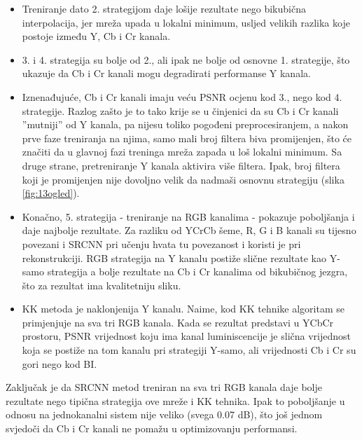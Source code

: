 \documentclass[12pt]{report}
\numberwithin{equation}{section}
\begin{document}
  \begin{itemize}
  
   \item Treniranje dato 2. strategijom daje lošije rezultate nego bikubična interpolacija, jer mreža upada u lokalni minimum, usljed velikih razlika koje postoje između Y, Cb i Cr kanala. 
   \item 3. i 4. strategija su bolje od 2., ali ipak ne bolje od osnovne 1. strategije, što ukazuje da Cb i Cr kanali mogu degradirati performanse Y kanala.
   \item Iznenađujuće, Cb i Cr kanali imaju veću PSNR ocjenu kod 3., nego kod 4. strategije. Razlog zašto je to tako krije se u činjenici da su Cb i Cr kanali ''mutniji'' od Y kanala, pa nijesu toliko pogođeni preprocesiranjem, a nakon prve faze treniranja na njima, samo mali broj filtera biva promijenjen, što će značiti da u glavnoj fazi treninga mreža zapada u loš lokalni minimum. Sa druge strane, pretreniranje Y kanala aktivira više filtera. Ipak, broj filtera koji je promijenjen nije dovoljno velik da nadmaši osnovnu strategiju (slika \ref{fig:13ogled}).
   \item Konačno, 5. strategija - treniranje na RGB kanalima - pokazuje poboljšanja i daje najbolje rezultate. Za razliku od YCrCb šeme, R, G i B kanali su tijesno povezani i SRCNN pri učenju hvata tu povezanost i koristi je pri rekonstrukciji. RGB strategija na Y kanalu postiže slične rezultate kao Y-samo strategija a bolje rezultate na Cb i Cr kanalima od bikubičnog jezgra, što za rezultat ima kvalitetniju sliku. 
   
   \item KK metoda je naklonjenija Y kanalu. Naime, kod KK tehnike algoritam se primjenjuje na sva tri RGB kanala. Kada se rezultat predstavi u YCbCr prostoru, PSNR vrijednost koju ima kanal luminiscencije je slična vrijednost koja se postiže na tom kanalu pri strategiji Y-samo, ali vrijednosti Cb i Cr su gori nego kod BI.  
   
  \end{itemize}
 

  
Zaključak je da SRCNN metod treniran na sva tri RGB kanala daje bolje rezultate nego tipična strategija ove mreže i KK tehnika. Ipak to poboljšanje u odnosu na jednokanalni sistem nije veliko (svega 0.07 dB), što još jednom svjedoči da Cb i Cr kanali ne pomažu u optimizovanju performansi. 
\end{document}
